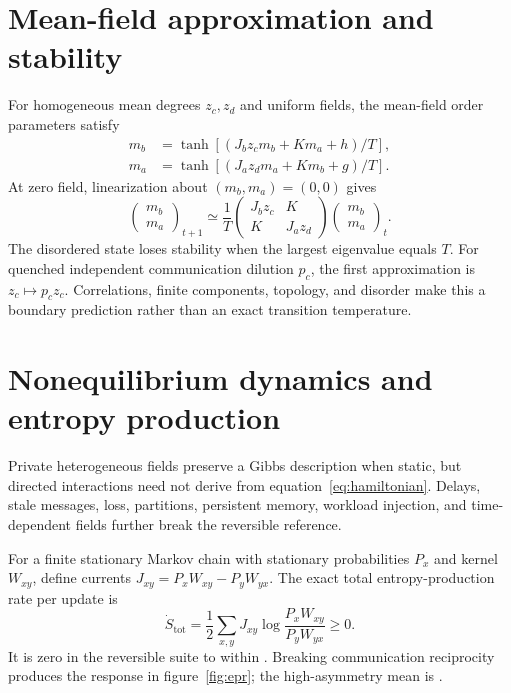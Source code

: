 \documentclass[12pt]{article}
\begin{document}
\section{Mean-field approximation and stability}

For homogeneous mean degrees $z_c,z_d$ and uniform fields, the mean-field order
parameters satisfy
\begin{align}
 m_b&=\tanh[(J_bz_cm_b+Km_a+h)/T],\\
 m_a&=\tanh[(J_az_dm_a+Km_b+g)/T].
 \label{eq:meanfield}
\end{align}
At zero field, linearization about $(m_b,m_a)=(0,0)$ gives
\begin{equation}
 \begin{pmatrix}m_b\\m_a\end{pmatrix}_{t+1}
 \simeq \frac{1}{T}
 \begin{pmatrix}J_bz_c&K\\K&J_az_d\end{pmatrix}
 \begin{pmatrix}m_b\\m_a\end{pmatrix}_{t}.
\end{equation}
The disordered state loses stability when the largest eigenvalue equals $T$.
For quenched independent communication dilution $p_c$, the first approximation
is $z_c\mapsto p_cz_c$. Correlations, finite components, topology, and disorder
make this a boundary prediction rather than an exact transition temperature.

\section{Nonequilibrium dynamics and entropy production}

Private heterogeneous fields preserve a Gibbs description when static, but
directed interactions need not derive from equation~\eqref{eq:hamiltonian}.
Delays, stale messages, loss, partitions, persistent memory, workload injection,
and time-dependent fields further break the reversible reference.

For a finite stationary Markov chain with stationary probabilities $P_x$ and
kernel $W_{xy}$, define currents $J_{xy}=P_xW_{xy}-P_yW_{yx}$. The exact total
entropy-production rate per update is \cite{schnakenberg1976,seifert2012}
\begin{equation}
 \dot S_{\mathrm{tot}}=
 \frac{1}{2}\sum_{x,y}J_{xy}
 \log\frac{P_xW_{xy}}{P_yW_{yx}}\ge0.
 \label{eq:epr}
\end{equation}
It is zero in the reversible suite to within
\ResultEquilibriumEPR. Breaking communication reciprocity produces the response
in figure~\ref{fig:epr}; the high-asymmetry mean is \ResultDrivenEPR.
\end{document}

